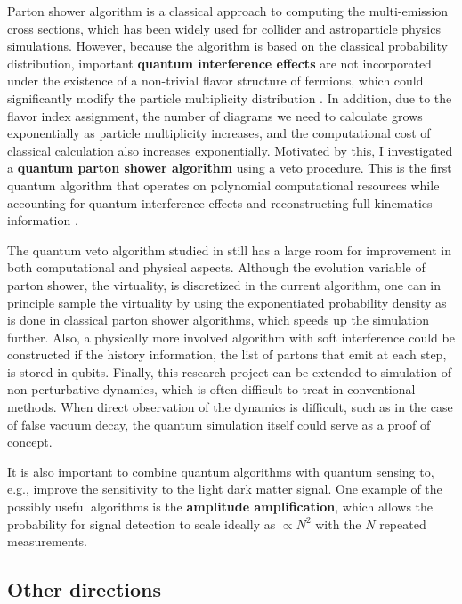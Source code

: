 \documentclass[12pt]{article}
\begin{document}
Parton shower algorithm is a classical approach to computing the multi-emission cross sections, which has been widely used for collider and astroparticle physics simulations.
However, because the algorithm is based on the classical probability distribution, important \textbf{quantum interference effects} are not incorporated under the existence of a non-trivial flavor structure of fermions, which could significantly modify the particle multiplicity distribution \cite{Chigusa:2022act}.
In addition, due to the flavor index assignment, the number of diagrams we need to calculate grows exponentially as particle multiplicity increases, and the computational cost of classical calculation also increases exponentially.
Motivated by this, I investigated a \textbf{quantum parton shower algorithm} using a veto procedure.
This is the first quantum algorithm that operates on polynomial computational resources while accounting for quantum interference effects and reconstructing full kinematics information \cite{Bauer:2023ujy}.

The quantum veto algorithm studied in \cite{Bauer:2023ujy} still has a large room for improvement in both computational and physical aspects.
Although the evolution variable of parton shower, the virtuality, is discretized in the current algorithm, one can in principle sample the virtuality by using the exponentiated probability density as is done in classical parton shower algorithms, which speeds up the simulation further.
Also, a physically more involved algorithm with soft interference could be constructed if the history information, the list of partons that emit at each step, is stored in qubits.
Finally, this research project can be extended to simulation of non-perturbative dynamics, which is often difficult to treat in conventional methods.
When direct observation of the dynamics is difficult, such as in the case of false vacuum decay, the quantum simulation itself could serve as a proof of concept.

It is also important to combine quantum algorithms with quantum sensing to, e.g., improve the sensitivity to the light dark matter signal.
One example of the possibly useful algorithms is the \textbf{amplitude amplification}, which allows the probability for signal detection to scale ideally as $\propto N^2$ with the $N$ repeated measurements.

\subsection*{Other directions}
\end{document}
